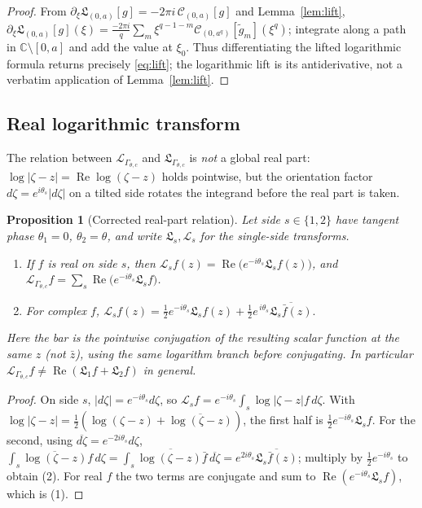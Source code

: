 \documentclass[pdflatex,sn-mathphys-num]{sn-jnl}%
\newcommand{\C}{\mathbb{C}}
\newcommand{\Cau}{\mathcal{C}}
\newcommand{\Lop}{\mathcal{L}}
\newcommand{\Lcx}{\mathfrak{L}}
\newcommand{\Gw}{\Gamma_{\theta,c}}
\newcommand{\Real}{\operatorname{Re}}
\theoremstyle{thmstyleone}
\newtheorem{proposition}[theorem]{Proposition}%
\theoremstyle{thmstyletwo}
\theoremstyle{thmstylethree}
\begin{document}
\begin{proof}
From $\partial_\xi\Lcx_{(0,a)}[g]=-2\pi i\,\Cau_{(0,a)}[g]$ and
Lemma~\ref{lem:lift}, $\partial_\xi\Lcx_{(0,a)}[g](\xi)
=\frac{-2\pi i}{q}\sum_m\xi^{q-1-m}\Cau_{(0,a^{q})}[\tilde g_m](\xi^{q})$;
integrate along a path in $\C\setminus[0,a]$ and add the value at $\xi_0$. Thus
differentiating the lifted logarithmic formula returns precisely \eqref{eq:lift};
the logarithmic lift is its antiderivative, not a verbatim application of
Lemma~\ref{lem:lift}.
\end{proof}

\subsection{Real logarithmic transform}
The relation between $\Lop_{\Gw}$ and $\Lcx_{\Gw}$ is \emph{not} a global real
part: $\log|\zeta-z|=\Real\log(\zeta-z)$ holds pointwise, but the orientation
factor $d\zeta=e^{i\theta_s}|d\zeta|$ on a tilted side rotates the integrand
before the real part is taken.

\begin{proposition}[Corrected real-part relation]\label{prop:realpart}
Let side $s\in\{1,2\}$ have tangent phase $\theta_1=0$, $\theta_2=\theta$, and
write $\Lcx_s,\Lop_s$ for the single-side transforms.
\begin{enumerate}
\item If $f$ is real on side $s$, then
  $\Lop_s f(z)=\Real\!\bigl(e^{-i\theta_s}\Lcx_s f(z)\bigr)$, and
  $\Lop_{\Gw}f=\sum_s\Real\!\bigl(e^{-i\theta_s}\Lcx_s f\bigr)$.
\item For complex $f$,
  $\Lop_s f(z)=\tfrac12 e^{-i\theta_s}\Lcx_s f(z)
   +\tfrac12 e^{\,i\theta_s}\overline{\Lcx_s\bar f(z)}.$
\end{enumerate}
Here the bar is the pointwise conjugation of the resulting scalar function at the
same $z$ (not $\bar z$), using the same logarithm branch before conjugating. In
particular $\Lop_{\Gw}f\neq\Real(\Lcx_1 f+\Lcx_2 f)$ in general.
\end{proposition}

\begin{proof}
On side $s$, $|d\zeta|=e^{-i\theta_s}d\zeta$, so
$\Lop_s f=e^{-i\theta_s}\int_s\log|\zeta-z|f\,d\zeta$. With
$\log|\zeta-z|=\tfrac12(\log(\zeta-z)+\overline{\log(\zeta-z)})$, the first half
is $\tfrac12 e^{-i\theta_s}\Lcx_s f$. For the second, using
$\overline{d\zeta}=e^{-2i\theta_s}d\zeta$,
$\int_s\overline{\log(\zeta-z)}f\,d\zeta
=\overline{\int_s\log(\zeta-z)\bar f\,\overline{d\zeta}}
=e^{2i\theta_s}\overline{\Lcx_s\bar f(z)}$; multiply by $\tfrac12 e^{-i\theta_s}$
to obtain (2). For real $f$ the two terms are conjugate and sum to
$\Real(e^{-i\theta_s}\Lcx_s f)$, which is (1).
\end{proof}
\end{document}
